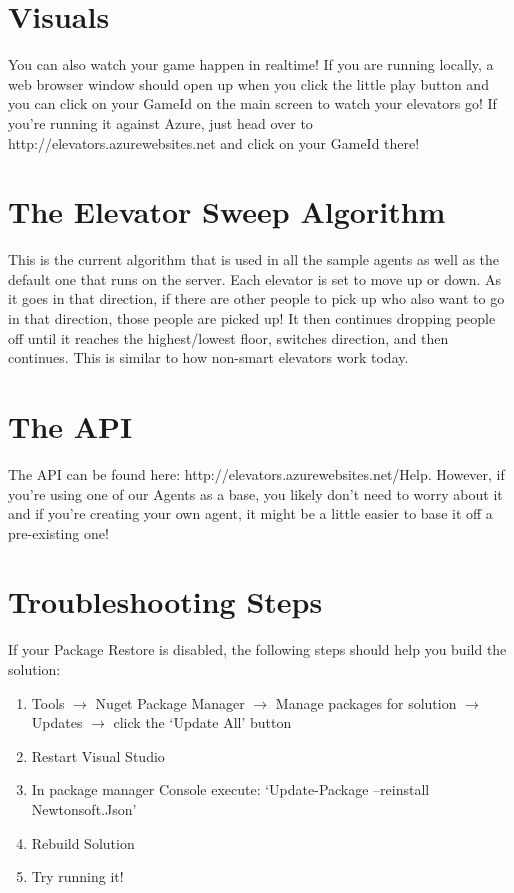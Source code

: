 \documentclass{article}
\begin{document}
\section*{Visuals}
You can also watch your game happen in realtime! If you are running locally, a web browser window should open up when you click the little play button and you can click on your GameId on the main screen to watch your elevators go! If you're running it against Azure, just head over to http://elevators.azurewebsites.net and click on your GameId there!

\newpage
\section*{The Elevator Sweep Algorithm}
This is the current algorithm that is used in all the sample agents as well as the default one that runs on the server. Each elevator is set to move up or down. As it goes in that direction, if there are other people to pick up who also want to go in that direction, those people are picked up! It then continues dropping people off until it reaches the highest/lowest floor, switches direction, and then continues. This is similar to how non-smart elevators work today.

\section*{The API}
The API can be found here: http://elevators.azurewebsites.net/Help. However, if you're using one of our Agents as a base, you likely don't need to worry about it and if you're creating your own agent, it might be a little easier to base it off a pre-existing one!

\section*{Troubleshooting Steps}
If your Package Restore is disabled, the following steps should help you build the solution:
\begin{enumerate}
	\item Tools $\to$ Nuget Package Manager $\to$ Manage packages for solution $\to$ Updates $\to$ click the ‘Update All’ button
	\item Restart Visual Studio
	\item In package manager Console execute: `Update-Package –reinstall Newtonsoft.Json'
	\item Rebuild Solution
	\item Try running it!
\end{enumerate}
\end{document}

